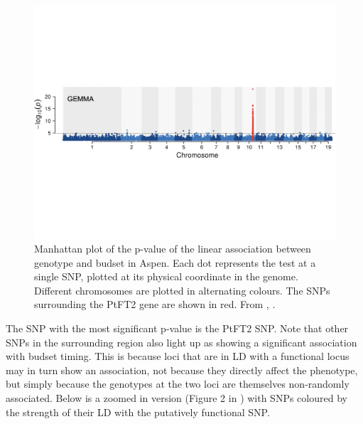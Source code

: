 \begin{figure}
\begin{center}
\includegraphics[width=\textwidth]{Journal_figs/Quant_gen/Wang_GWAS_poplar/Wang_Fig_just_Manhattan.pdf}
\end{center}

\caption{Manhattan plot of the p-value of the linear association
  between genotype and budset in Aspen. Each dot represents the test at a single SNP,
  plotted at its physical coordinate in the genome. Different chromosomes
  are plotted in alternating colours. The SNPs surrounding the PtFT2
  gene are shown in red. From \citet{wang:18}, \PLOSccBY. } \label{fig:Apsen_Manhattan}
\end{figure}
The SNP with the most significant p-value is the PtFT2 SNP. Note
that other SNPs in the surrounding region also light up as showing a
significant association with budset timing. This is because loci that are in LD with a functional locus may in turn show an
association, not because they directly affect the phenotype, but simply
because the genotypes at the two loci are themselves non-randomly
associated. Below is a zoomed in version (Figure 2 in \citet{wang:18}) with SNPs coloured by the
strength of their LD with the putatively functional SNP.
